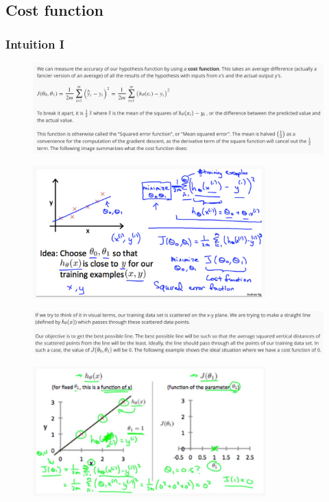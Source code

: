 \documentclass[12pt, A4,onecolumn]{article} %
\begin{document}
\subsection{Cost function}
\subsubsection{Intuition I}
\begin{figure}[H]
	\centering
	\includegraphics[width=1\textwidth]{./Imagenes/costFunc1}
\end{figure}	

\begin{figure}[H]
	\centering
	\includegraphics[width=0.8\textwidth]{./Imagenes/costFunc2}
\end{figure}	

\begin{figure}[H]
	\centering
	\includegraphics[width=1\textwidth]{./Imagenes/costFunc3}
\end{figure}	

\begin{figure}[H]
	\centering
	\includegraphics[width=0.8\textwidth]{./Imagenes/costFunc4}
\end{figure}	
\end{document}
